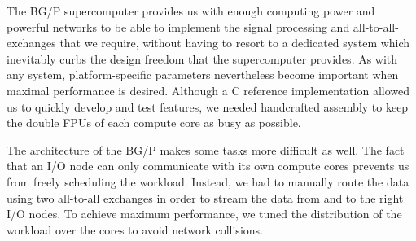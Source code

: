 \documentclass{llncs}
\begin{document}
The BG/P supercomputer provides us with enough computing power and powerful networks to be able to implement the signal processing and all-to-all-exchanges that we require, without having to resort to a dedicated system which inevitably curbs the design freedom that the supercomputer provides. As with any system, platform-specific parameters nevertheless become important when maximal performance is desired. Although a C reference implementation allowed us to quickly develop and test features, we needed handcrafted assembly to keep the double FPUs of each compute core as busy as possible.

The architecture of the BG/P makes some tasks more difficult as well. The fact that an I/O node can only communicate with its own compute cores prevents us from freely scheduling the workload. Instead, we had to manually route the data using two all-to-all exchanges in order to stream the data from and to the right I/O nodes. To achieve maximum performance, we tuned the distribution of the workload over the cores to avoid network collisions.



\end{document}
